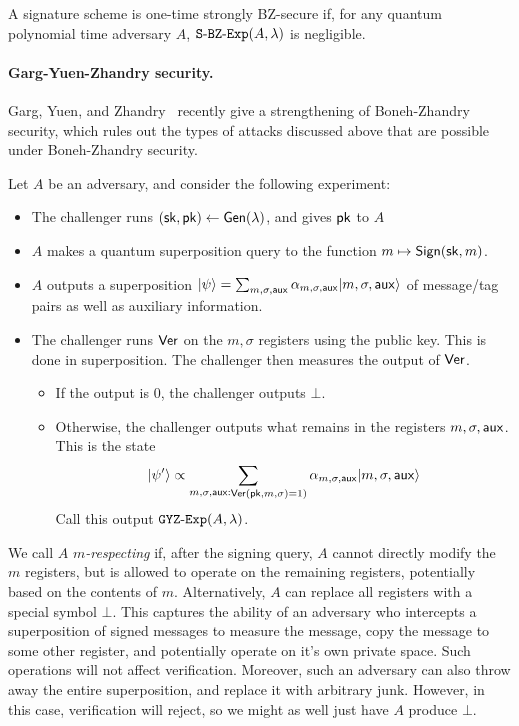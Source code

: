 \begin{definition} A signature scheme is one-time strongly BZ-secure if, for any quantum polynomial time adversary $A$, ${\tt{S\text{-}BZ\text{-}Exp}}(A,\lambda)$ is negligible.
\end{definition}

\paragraph{Garg-Yuen-Zhandry security.} Garg, Yuen, and Zhandry~\cite{C:GarYueZha17} recently give a strengthening of Boneh-Zhandry security, which rules out the types of attacks discussed above that are possible under Boneh-Zhandry security.

Let $A$ be an adversary, and consider the following experiment:
\begin{itemize}
	\item The challenger runs $({\sf sk},{\sf pk})\gets{\sf Gen}(\lambda)$, and gives ${\sf pk}$ to $A$
	\item $A$ makes a quantum superposition query to the function $m\mapsto {\sf Sign}({\sf sk},m)$.  
	\item $A$ outputs a superposition $|\psi\rangle=\sum_{m,\sigma,{\sf aux}}\alpha_{m,\sigma,{\sf aux}}|m,\sigma,{\sf aux}\rangle$ of message/tag pairs as well as auxiliary information.
	\item The challenger runs ${\sf Ver}$ on the $m,\sigma$ registers using the public key.  This is done in superposition.  The challenger then measures the output of ${\sf Ver}$.
	\begin{itemize}
		\item If the output is 0, the challenger outputs $\bot$.
		\item Otherwise, the challenger outputs what remains in the registers $m,\sigma,{\sf aux}$.  This is the state \[|\psi'\rangle\propto \sum_{\substack{m,\sigma,{\sf aux}:}{{\sf Ver}({\sf pk},m,\sigma)=1)}}\alpha_{m,\sigma,{\sf aux}}|m,\sigma,{\sf aux}\rangle\]
		Call this output ${\tt{GYZ\text{-}Exp}}(A,\lambda)$.
	\end{itemize}
\end{itemize}

We call $A$ \emph{$m$-respecting} if, after the signing query, $A$ cannot directly modify the $m$ registers, but is allowed to operate on the remaining registers, potentially based on the contents of $m$.  Alternatively, $A$ can replace all registers with a special symbol $\bot$.  This captures the ability of an adversary who intercepts a superposition of signed messages to measure the message, copy the message to some other register, and potentially operate on it's own private space.  Such operations will not affect verification.  Moreover, such an adversary can also throw away the entire superposition, and replace it with arbitrary junk.  However, in this case, verification will reject, so we might as well just have $A$ produce $\bot$.

